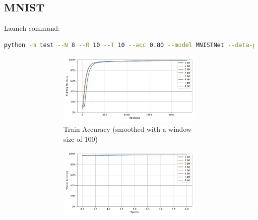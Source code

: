     \subsection{MNIST}
    \label{appendix:accuracy_curves_mnist}
        Launch command: 
        \begin{lstlisting}[language=Bash, basicstyle=\small, breaklines=true]
python -m test --N 8 --R 10 --T 10 --acc 0.80 --model MNISTNet --data-path /scratch/zyi/codeSpace/data --dataset MNIST --batch-size 128 --opt adam --lr 2e-3 --lr-scheduler none --epochs 5 --lr-warmup-epochs 0 --output-dir /scratch/zyi/codeSpace/MultibitSpikes --mixup-alpha 0.0 --cutmix-alpha 0.0 --label-smoothing 0.0 --disable-amp
        \end{lstlisting}

        \begin{figure}[H]
            \centering
            \begin{subfigure}[H]{0.69\textwidth}
                \centering
                \begin{subfigure}[H]{\textwidth}
                    \centering
                    \includegraphics[width=\textwidth]{../standard/MNIST/plots/mnist_train_acc.pdf}
                    \caption{Train Accuracy (smoothed with a window size of 100)}
                \end{subfigure}
                \hfill
                \begin{subfigure}[H]{\textwidth}
                    \centering
                    \includegraphics[width=\textwidth]{../standard/MNIST/plots/mnist_test_acc.pdf}

\end{subfigure}
\end{subfigure}
\end{figure}
